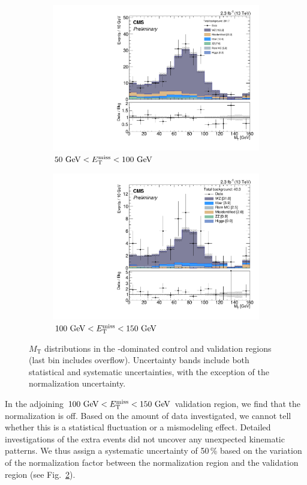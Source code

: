\begin{figure}
\begin{center}
	\begin{subfigure}[b]{.7\textwidth}
		\includegraphics[width=\textwidth]{Background/bkg_WZ/WZ_MET50to100_MT}
		\caption{$50\,\,\text{Ge\hspace{-.08em}V} < E_{\mathrm{T}}^{\text{miss}} < 100\,\,\text{Ge\hspace{-.08em}V}$} \label{fig:WZ/MET50to100_MT}
	\end{subfigure}
	\begin{subfigure}[b]{.7\textwidth}
		\includegraphics[width=\textwidth]{Background/bkg_WZ/WZ_MET100to150_MT}
		\caption{$100\,\,\text{Ge\hspace{-.08em}V} < E_{\mathrm{T}}^{\text{miss}} < 150\,\,\text{Ge\hspace{-.08em}V}$ } \label{fig:WZ/MET100to150_MT}
	\end{subfigure}
	\caption{$M_\textrm{T}$ distributions in the \WZ-dominated control and validation regions (last bin includes overflow). Uncertainty bands include both statistical and systematic uncertainties, with the exception of the \WZ normalization uncertainty.
	\label{fig:WZ}}
\end{center}
\end{figure}

In the adjoining $100\,\,\text{Ge\hspace{-.08em}V} < E_{\mathrm{T}}^{\text{miss}} < 150\,\,\text{Ge\hspace{-.08em}V}$ validation region, we find that the normalization is off. Based on the amount of data investigated, we cannot tell whether this is a statistical fluctuation or a mismodeling effect. Detailed investigations of the extra events did not uncover any unexpected kinematic patterns. We thus assign a systematic uncertainty of 50\,\% based on the variation of the normalization factor between the normalization region and the validation region (see Fig.~\ref{fig:WZ/MET100to150_MT}).
